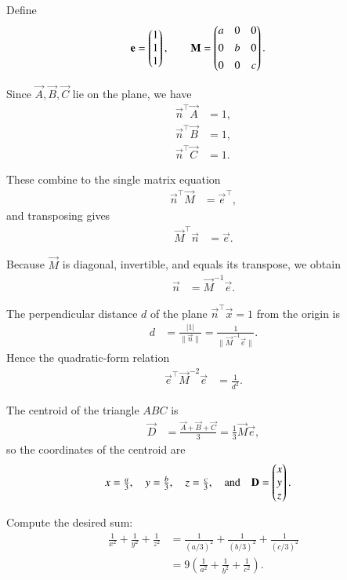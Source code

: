 \documentclass[journal]{IEEEtran}
\begin{document}
Define
\begin{align}
\mathbf{e} &= \begin{pmatrix}1\\1\\1\end{pmatrix}, \qquad 
\mathbf{M} = \begin{pmatrix}a&0&0\\[4pt]0&b&0\\[4pt]0&0&c\end{pmatrix}.
\end{align}

Since $\vec{A},\vec{B},\vec{C}$ lie on the plane, we have
\begin{align}
\vec{n}^\top \vec{A} &= 1, \\[4pt]
\vec{n}^\top \vec{B} &= 1, \\[4pt]
\vec{n}^\top \vec{C} &= 1.
\end{align}

These combine to the single matrix equation
\begin{align}
\vec{n}^\top \vec{M} &= \vec{e}^\top,
\end{align}
and transposing gives
\begin{align}
\vec{M}^\top \vec{n} &= \vec{e}.
\end{align}

Because \(\vec{M}\) is diagonal, invertible, and equals its transpose, we obtain
\begin{align}
\vec{n} &= \vec{M}^{-1}\vec{e}.
\end{align}

The perpendicular distance \(d\) of the plane \(\vec{n}^\top \vec{x}=1\) from the origin is
\begin{align}
d &= \frac{|1|}{\|\vec{n}\|}
= \frac{1}{\|\vec{M}^{-1}\vec{e}\|}.
\end{align}
Hence the quadratic-form relation
\begin{align}
\vec{e}^\top \vec{M}^{-2} \vec{e} &= \frac{1}{d^2}.
\end{align}

The centroid of the triangle \(ABC\) is
\begin{align}
\vec{D} &= \frac{\vec{A}+\vec{B}+\vec{C}}{3}
= \tfrac{1}{3}\vec{M}\vec{e},
\end{align}
so the coordinates of the centroid are
\begin{align}
x &= \tfrac{a}{3}, \quad y=\tfrac{b}{3}, \quad z=\tfrac{c}{3},
\quad\text{and}\quad \mathbf{D}=\begin{pmatrix}x\\y\\z\end{pmatrix}.
\end{align}

Compute the desired sum:
\begin{align}
\frac{1}{x^2}+\frac{1}{y^2}+\frac{1}{z^2}
&= \frac{1}{(a/3)^2}+\frac{1}{(b/3)^2}+\frac{1}{(c/3)^2} \\
&= 9\!\left(\frac{1}{a^2}+\frac{1}{b^2}+\frac{1}{c^2}\right).
\end{align}
\end{document}
